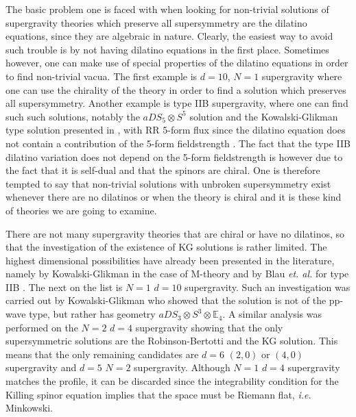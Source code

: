 \documentclass[a4paper,12pt]{article}
\begin{document}
\par
The basic problem one is faced with when looking for non-trivial solutions of supergravity theories
which preserve all supersymmetry are the dilatino equations, since they are algebraic in
nature. Clearly, the easiest way to avoid such trouble is by not having dilatino equations
in the first place. Sometimes however, one can make use of special properties of the
dilatino equations in order to find non-trivial vacua. The first example is $d=10$, $N=1$
supergravity where one can use the chirality of the theory \cite{art:K_2} in order to
find a solution which preserves all supersymmetry. Another example is type IIB supergravity,
where one can find such such solutions, notably the $aDS_{5}\otimes S^{5}$ solution and the
Kowalski-Glikman type solution presented in \cite{art:blau}, with RR 5-form flux since the dilatino equation
does not contain a contribution of the 5-form fieldstrength \cite{art:S}. The fact that the type IIB dilatino
variation does not depend on the 5-form fieldstrength is however due to the fact that it is
self-dual and that the spinors are chiral.
One is therefore tempted to say that non-trivial solutions with unbroken supersymmetry exist
whenever there are no dilatinos or when the theory is chiral and it is these kind of theories
we are going to examine.
\par
There are not many supergravity theories that are chiral or have no dilatinos, so that the investigation
of the existence of KG solutions is rather limited. The highest dimensional possibilities have
already been presented in the literature, namely by Kowalski-Glikman in the case of M-theory \cite{art:K_1}
and by Blau {\em et. al.} for type IIB \cite{art:blau}. The next on the list is $N=1$ $d=10$ supergravity. 
Such an investigation was carried out by Kowalski-Glikman \cite{art:K_2} who showed that the solution
is not of the pp-wave type, but rather has geometry $aDS_{3}\otimes S^{3}\otimes\mathbb{E}_{4}$.
A similar analysis was performed on the $N=2$ $d=4$ supergravity \cite{art:K_3} showing that the 
only supersymmetric solutions are the Robinson-Bertotti and the KG solution.
This means that the only remaining candidates are $d=6$ $(2,0)$ or $(4,0)$ supergravity and $d=5$ $N=2$ supergravity. 
Although $N=1$ $d=4$ supergravity matches the profile, it can be discarded since
the integrability condition for the Killing spinor equation implies that the space must be 
Riemann flat, {\em i.e.} Minkowski.
\end{document}
